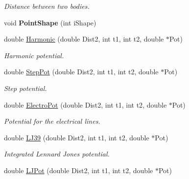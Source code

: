 \begin{DoxyCompactItemize}
\begin{DoxyCompactList}\small\item\em Distance between two bodies. \end{DoxyCompactList}\item 
void {\bfseries Point\+Shape} (int i\+Shape)\hypertarget{classForces_a0d76b871ebe7ef570ef9c2fcba03ddb8}{}\label{classForces_a0d76b871ebe7ef570ef9c2fcba03ddb8}

\item 
double \hyperlink{classForces_af449f7871a4d5c5f1e263e4fe660bd63}{Harmonic} (double Dist2, int t1, int t2, double $\ast$Pot)\hypertarget{classForces_af449f7871a4d5c5f1e263e4fe660bd63}{}\label{classForces_af449f7871a4d5c5f1e263e4fe660bd63}

\begin{DoxyCompactList}\small\item\em Harmonic potential. \end{DoxyCompactList}\item 
double \hyperlink{classForces_a1f0b019b2a8c81938b8f4a3f3ddcfc48}{Step\+Pot} (double Dist2, int t1, int t2, double $\ast$Pot)\hypertarget{classForces_a1f0b019b2a8c81938b8f4a3f3ddcfc48}{}\label{classForces_a1f0b019b2a8c81938b8f4a3f3ddcfc48}

\begin{DoxyCompactList}\small\item\em Step potential. \end{DoxyCompactList}\item 
double \hyperlink{classForces_ad1ef4b910c2f6e057b8b2e079d32100b}{Electro\+Pot} (double Dist2, int t1, int t2, double $\ast$Pot)\hypertarget{classForces_ad1ef4b910c2f6e057b8b2e079d32100b}{}\label{classForces_ad1ef4b910c2f6e057b8b2e079d32100b}

\begin{DoxyCompactList}\small\item\em Potential for the electrical lines. \end{DoxyCompactList}\item 
double \hyperlink{classForces_a28fd299b40762b1703462b830df2473d}{L\+J39} (double Dist2, int t1, int t2, double $\ast$Pot)\hypertarget{classForces_a28fd299b40762b1703462b830df2473d}{}\label{classForces_a28fd299b40762b1703462b830df2473d}

\begin{DoxyCompactList}\small\item\em Integrated Lennard Jones potential. \end{DoxyCompactList}\item 
double \hyperlink{classForces_ad6b11a62ba4f9871d598109fe007a121}{L\+J\+Pot} (double Dist2, int t1, int t2, double $\ast$Pot)\hypertarget{classForces_ad6b11a62ba4f9871d598109fe007a121}{}\label{classForces_ad6b11a62ba4f9871d598109fe007a121}


\end{DoxyCompactItemize}
